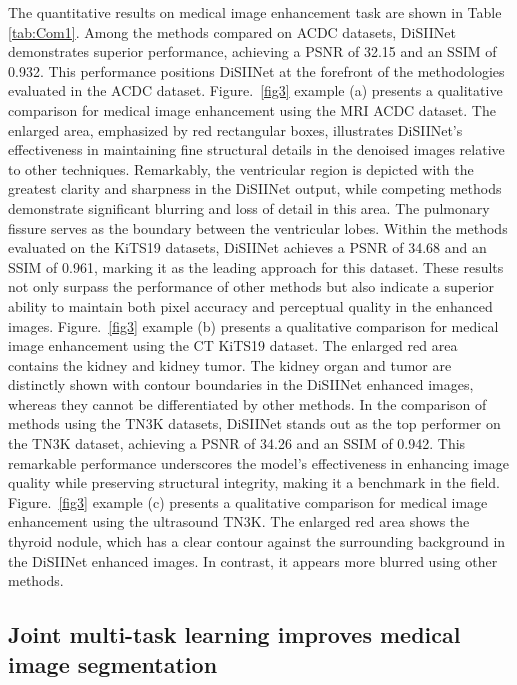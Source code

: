 \documentclass{article}
\begin{document}
The quantitative results on medical image enhancement task are shown in Table \ref{tab:Com1}. Among the methods compared on ACDC datasets, DiSIINet demonstrates superior performance, achieving a PSNR of 32.15 and an SSIM of 0.932. This performance positions DiSIINet at the forefront of the methodologies evaluated in the ACDC dataset. Figure.~\ref{fig3} example (a) presents a qualitative comparison for medical image enhancement using the MRI ACDC dataset. The enlarged area, emphasized by red rectangular boxes, illustrates DiSIINet's effectiveness in maintaining fine structural details in the denoised images relative to other techniques. Remarkably, the ventricular region is depicted with the greatest clarity and sharpness in the DiSIINet output, while competing methods demonstrate significant blurring and loss of detail in this area. The pulmonary fissure serves as the boundary between the ventricular lobes. Within the methods evaluated on the KiTS19 datasets, DiSIINet achieves a PSNR of 34.68 and an SSIM of 0.961, marking it as the leading approach for this dataset. These results not only surpass the performance of other methods but also indicate a superior ability to maintain both pixel accuracy and perceptual quality in the enhanced images. Figure.~\ref{fig3} example (b) presents a qualitative comparison for medical image enhancement using the CT KiTS19 dataset. The enlarged red area contains the kidney and kidney tumor. The kidney organ and tumor are distinctly shown with contour boundaries in the DiSIINet enhanced images, whereas they cannot be differentiated by other methods. In the comparison of methods using the TN3K datasets, DiSIINet stands out as the top performer on the TN3K dataset, achieving a PSNR of 34.26 and an SSIM of 0.942. This remarkable performance underscores the model's effectiveness in enhancing image quality while preserving structural integrity, making it a benchmark in the field. Figure.~\ref{fig3} example (c) presents a qualitative comparison for medical image enhancement using the ultrasound TN3K. The enlarged red area shows the thyroid nodule, which has a clear contour against the surrounding background in the DiSIINet enhanced images. In contrast, it appears more blurred using other methods. 


\subsection{Joint multi-task learning improves medical image segmentation}
\end{document}
